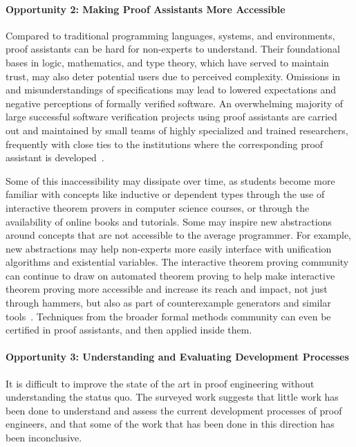 \paragraph{Opportunity 2: Making Proof Assistants More Accessible}
Compared to traditional programming languages, systems, and environments, proof assistants can be hard for non-experts to understand.
Their foundational bases in logic, mathematics, and type theory, which have served to maintain trust, may also deter potential users due to perceived complexity.
Omissions in and misunderstandings of specifications may lead to lowered expectations and negative perceptions of formally verified software.
An overwhelming majority of large successful software verification projects using proof assistants are carried out and maintained by small teams of highly specialized and trained researchers, frequently with close ties to the institutions where the corresponding proof assistant is developed~\citep{Gonthier2013}. 

Some of this inaccessibility may dissipate over time, as students become more familiar with concepts like
inductive or dependent types through the use of interactive theorem provers in computer science courses,
or through the availability of online books and tutorials.
Some may inspire new abstractions around concepts that are not accessible to the average programmer.
For example, new abstractions may help non-experts more easily interface with unification algorithms and existential variables.
The interactive theorem proving community can continue to draw on automated theorem proving to help make interactive theorem proving more accessible and increase its reach and impact, not just through hammers, but also as part of counterexample generators and similar tools~\citep{Blanchette2010}.
Techniques from the broader formal methods community can even be certified in proof assistants, and then applied inside them. 

\paragraph{Opportunity 3: Understanding and Evaluating Development Processes}
It is difficult to improve the state of the art in proof engineering without understanding the status quo.
The surveyed work suggests that little work has been done to understand and assess the current development processes of proof engineers,
and that some of the work that has been done in this direction has been inconclusive.

